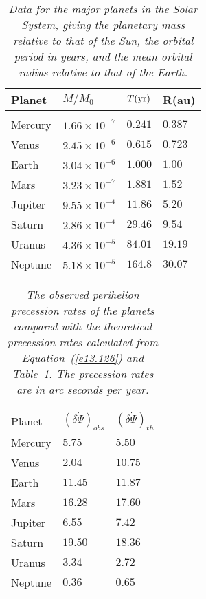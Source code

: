\begin{table}
\centering
\begin{tabular}{llll}\hline 
Planet  & $M/M_0$              & $T({\rm yr})$ & R({\rm au})\\[0.25ex]\hline
&&&\\[-2ex]
Mercury & $1.66\times 10^{-7}$ & $0.241$       & $0.387$\\[0.5ex]
Venus   & $2.45\times 10^{-6}$ & $0.615$       & $0.723$\\[0.5ex]
Earth   & $3.04\times 10^{-6}$ & $1.000$       & $1.00$\\[0.5ex]
Mars    & $3.23\times 10^{-7}$ & $1.881$       & $1.52$\\[0.5ex]
Jupiter & $9.55\times 10^{-4}$ & $11.86$       & $5.20$\\[0.5ex]
Saturn  & $2.86\times 10^{-4}$ & $29.46$       & $9.54$\\[0.5ex]
Uranus  & $4.36\times 10^{-5}$ & $84.01$       & $19.19$\\[0.5ex]
Neptune & $5.18\times 10^{-5}$ & $164.8$       & $30.07$\\[0.5ex]
\end{tabular}
\caption{\em Data for the major planets in the Solar System, giving the planetary mass relative to that of the Sun, the orbital period in years, and the mean orbital
radius relative to that of the Earth.}\label{t1a}
\end{table}

\begin{table}
\centering
\begin{tabular}{lll}\hline&&\\[-2ex]
Planet  & $(\delta\dot{\Psi})_{obs}$              & $(\delta\dot{\Psi})_{th}$ \\[0.5ex]\hline
Mercury & $5.75$    & $5.50$      \\[0.5ex]
Venus     & $2.04$    & $10.75$    \\[0.5ex]
Earth      & $11.45$   & $11.87$    \\[0.5ex]
Mars       & $16.28$  & $17.60$     \\[0.5ex]
Jupiter    & $6.55$    & $7.42$       \\[0.5ex]
Saturn     & $19.50$  & $18.36$     \\[0.5ex]
Uranus    & $3.34$    & $2.72$       \\[0.5ex]
Neptune  & $0.36$    & $0.65$       \\[0.5ex]
\end{tabular}
\caption{\em The observed perihelion precession rates of the planets compared with the theoretical precession rates calculated from Equation~(\ref{e13.126})
and Table~\ref{t1a}. The precession rates are  in arc seconds per year.}\label{t2a}
\end{table}

